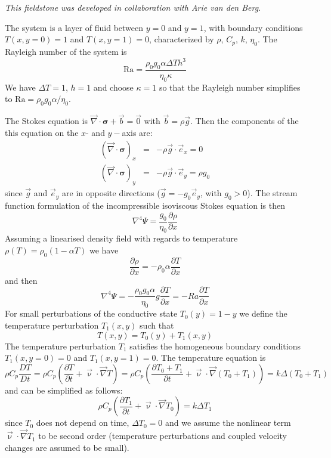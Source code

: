 
{\sl This fieldstone was developed in collaboration with Arie van den Berg}.

The system is a layer of fluid between $y=0$ and $y=1$, with boundary conditions $T(x,y=0)=1$ and $T(x,y=1)=0$, characterized by $\rho$, $C_p$, $k$, $\eta_0$. The Rayleigh number of the system is 
\[
\text{Ra}= \frac{\rho_0 g_0 \alpha \Delta T h^3}{\eta_0 \kappa}
\]
We have $\Delta T=1$, $h=1$ and choose $\kappa=1$ so that the Rayleigh number simplifies to
$\text{Ra}= \rho_0 g_0 \alpha /\eta_0$.

The Stokes equation is $\vec \nabla \cdot \bm \sigma + \vec b = \vec 0$ with $\vec b=\rho \vec g$. 
Then the components of the this equation on the $x$- and $y-$axis are:
\begin{eqnarray}
(\vec \nabla \cdot \bm \sigma)_x &=& - \rho \vec g \cdot \vec e_x = 0\\ 
(\vec \nabla \cdot \bm \sigma)_y &=& - \rho \vec g \cdot \vec e_y = \rho g_0
\end{eqnarray}
since $\vec g$ and $\vec e_y$ are in opposite directions ($\vec g = - g_0 \vec e_y$, with $g_0>0$).
The stream function formulation of the incompressible isoviscous Stokes equation is then
\[
\nabla^4 \Psi= \frac{g_0}{\eta_0}  \frac{\partial \rho}{\partial x} 
\]
Assuming a linearised density field with regards to temperature $\rho(T)=\rho_0 (1-\alpha T)$
we have 
\[
\frac{\partial \rho}{\partial x} 
=
-\rho_0 \alpha \frac{\partial T}{\partial x} 
\]
and then 
\begin{equation}
\boxed{
\nabla^4 \Psi= -\frac{\rho_0 g_0 \alpha}{\eta_0} g \frac{\partial T}{\partial x} 
= -Ra \frac{\partial T}{\partial x} 
}
\end{equation}
For small perturbations of the conductive state $T_0(y)=1-y$ we define the temperature perturbation $T_1(x,y)$ such that 
\[
T(x,y)=T_0(y)+T_1(x,y)
\]
The temperature perturbation $T_1$ satisfies the homogeneous boundary conditions $T_1(x,y=0)=0$ and
$T_1(x,y=1)=0$.
The temperature equation is
\[
\rho C_p \frac{DT}{Dt}
=\rho C_p \left( \frac{\partial T}{\partial t} + {\vec \upnu}\cdot {\vec \nabla} T \right) 
=\rho C_p \left( \frac{\partial T_0+T_1}{\partial t} + {\vec \upnu}\cdot {\vec \nabla} (T_0+T_1) \right) 
= k \Delta (T_0+T_1)
\]
and can be simplified as follows:
\[
\rho C_p \left( \frac{\partial T_1}{\partial t} + {\vec \upnu}\cdot {\vec \nabla} T_0 \right) 
= k \Delta T_1
\]
since $T_0$ does not depend on time, $\Delta T_0=0$ and we assume the nonlinear term ${\vec \upnu}\cdot {\vec \nabla} T_1 $ to be second order (temperature perturbations and coupled velocity changes are assumed to be small).
